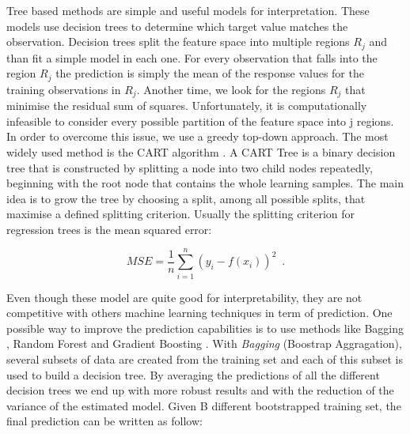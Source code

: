 Tree based methods are simple and useful models for interpretation. These models use decision trees to determine which target value matches the observation. Decision trees split the feature space into multiple regions $R_j$ and than fit a simple model in each one. For every observation that falls into the region $R_j$ the prediction is simply the mean of the response values for the training observations in $R_j$. Another time, we look for the regions $R_j$ that minimise the residual sum of squares. Unfortunately, it is computationally infeasible to consider every possible partition of the feature space into j regions. In order to overcome this issue, we use a greedy top-down approach. The most widely used method is the CART algorithm \citep{breiman2017classification}. A CART Tree is a binary decision tree that is constructed by splitting a node into two child nodes repeatedly, beginning with the root node that contains the whole learning samples. The main idea is to grow the tree by choosing a split, among all possible splits, that maximise a defined splitting criterion. Usually the splitting criterion for regression trees is the mean squared error:

\begin{equation}
    MSE = \frac{1}{n}\sum_{i=1}^{n}(y_i -f(x_i))^2
    \enspace.
\end{equation}

Even though these model are quite good for interpretability, they are not competitive with others machine learning techniques in term of prediction. One possible way to improve the prediction capabilities is to use methods like Bagging \citep{breiman1996bagging}, Random Forest \citep{breiman2001random} and Gradient Boosting \citep{friedman2001greedy}.
With \textit{Bagging} (Boostrap Aggragation), several subsets of data are created from the training set and each of this subset is used to build a decision tree. By averaging the predictions of all the different decision trees we end up with more robust results and with the reduction of the variance of the estimated model. Given B different bootstrapped training set, the final prediction can be written as follow:

